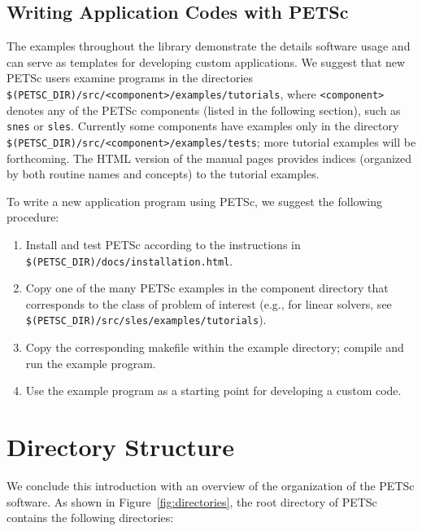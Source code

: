 \subsection*{Writing Application Codes with PETSc}

The examples throughout the library demonstrate the details software usage
and can serve as templates for developing
custom applications.  We suggest that new PETSc
users examine programs in the directories {\tt
\$(PETSC\_DIR)/src/<component>/examples/tutorials}, where {\tt <component>}
denotes any of the PETSc components (listed in the following
section), such as {\tt snes} or {\tt sles}.  
Currently some components have examples only in the directory
{\tt \$(PETSC\_DIR)/src/<component>/examples/tests}; more tutorial examples
will be forthcoming.  The HTML version of the manual pages provides indices
(organized by both routine names and concepts) to the tutorial examples.

To write a new application program using PETSc, we suggest the
following procedure:
\begin{enumerate}
\item Install and test PETSc according to the instructions in 
      {\tt \$(PETSC\_DIR)/docs/installation.html}.
\item Copy one of the many PETSc examples in the component directory
      that corresponds to the class of problem of interest (e.g.,
      for linear solvers, see {\tt \$(PETSC\_DIR)/src/sles/examples/tutorials}).
\item Copy the corresponding makefile within the example directory;
      compile and run the example program.
\item Use the example program as a starting point for developing a custom code.
\end{enumerate}


\section{Directory Structure}

We conclude this introduction with an overview of the
organization of the PETSc software.  As shown in Figure~\ref{fig:directories},
the root directory of PETSc contains the following directories:

